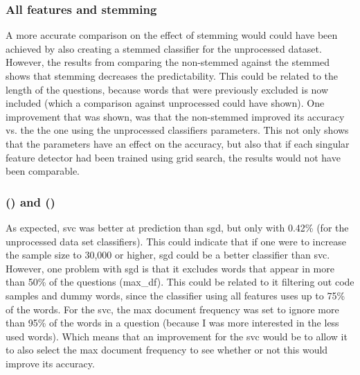 \subsubsection{All features and stemming}
A more accurate comparison on the effect of stemming would could have been achieved by also creating a stemmed classifier for the unprocessed dataset. 
However, the results from comparing the non-stemmed against the stemmed shows that stemming decreases the predictability.
This could be related to the length of the questions, because words that were previously excluded is now included (which a comparison against unprocessed could have shown).
One improvement that was shown, was that the non-stemmed improved its accuracy vs. the the one using the unprocessed classifiers parameters. 
This not only shows that the parameters have an effect on the accuracy, but also that if each singular feature detector had been trained using grid search, the results would not have been comparable.

\subsubsection[SVC and SGD]{ () and  ()}
As expected, \gls{svc} was better at prediction than \gls{sgd}, but only with 0.42\% (for the unprocessed data set classifiers).
This could indicate that if one were to increase the sample size to 30,000 or higher, \gls{sgd} could be a better classifier than \gls{svc}.
However, one problem with \gls{sgd} is that it excludes words that appear in more than 50\% of the questions (max\_df). 
This could be related to it filtering out code samples and dummy words, since the classifier using all features uses up to 75\% of the words.
For the \gls{svc}, the max document frequency was set to ignore more than 95\% of the words in a question (because I was more interested in the less used words). 
Which means that an improvement for the \gls{svc} would be to allow it to also select the max document frequency to see whether or not this would improve its accuracy.


